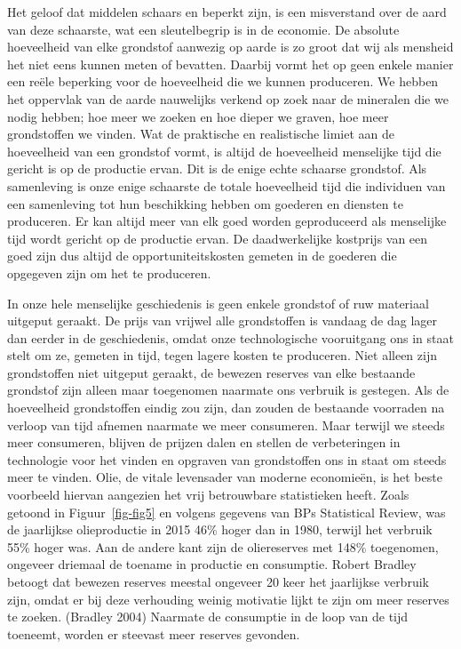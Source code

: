 \documentclass[
  a5paper,
  smalldemyvopaper,11pt,twoside,onecolumn,openright,extrafontsizes,
hidelinks]{memoir}
\begin{document}
Het geloof dat middelen schaars en beperkt zijn, is een misverstand over
de aard van deze schaarste, wat een sleutelbegrip is in de economie. De
absolute hoeveelheid van elke grondstof aanwezig op aarde is zo groot
dat wij als mensheid het niet eens kunnen meten of bevatten. Daarbij
vormt het op geen enkele manier een reële beperking voor de hoeveelheid
die we kunnen produceren. We hebben het oppervlak van de aarde
nauwelijks verkend op zoek naar de mineralen die we nodig hebben; hoe
meer we zoeken en hoe dieper we graven, hoe meer grondstoffen we vinden.
Wat de praktische en realistische limiet aan de hoeveelheid van een
grondstof vormt, is altijd de hoeveelheid menselijke tijd die gericht is
op de productie ervan. Dit is de enige echte schaarse grondstof. Als
samenleving is onze enige schaarste de totale hoeveelheid tijd die
individuen van een samenleving tot hun beschikking hebben om goederen en
diensten te produceren. Er kan altijd meer van elk goed worden
geproduceerd als menselijke tijd wordt gericht op de productie ervan. De
daadwerkelijke kostprijs van een goed zijn dus altijd de
opportuniteitskosten gemeten in de goederen die opgegeven zijn om het te
produceren.

In onze hele menselijke geschiedenis is geen enkele grondstof of ruw
materiaal uitgeput geraakt. De prijs van vrijwel alle grondstoffen is
vandaag de dag lager dan eerder in de geschiedenis, omdat onze
technologische vooruitgang ons in staat stelt om ze, gemeten in tijd,
tegen lagere kosten te produceren. Niet alleen zijn grondstoffen niet
uitgeput geraakt, de bewezen reserves van elke bestaande grondstof zijn
alleen maar toegenomen naarmate ons verbruik is gestegen. Als de
hoeveelheid grondstoffen eindig zou zijn, dan zouden de bestaande
voorraden na verloop van tijd afnemen naarmate we meer consumeren. Maar
terwijl we steeds meer consumeren, blijven de prijzen dalen en stellen
de verbeteringen in technologie voor het vinden en opgraven van
grondstoffen ons in staat om steeds meer te vinden. Olie, de vitale
levensader van moderne economieën, is het beste voorbeeld hiervan
aangezien het vrij betrouwbare statistieken heeft. Zoals getoond in
Figuur~\ref{fig-fig5} en volgens gegevens van BPs Statistical Review,
was de jaarlijkse olieproductie in 2015 46\% hoger dan in 1980, terwijl
het verbruik 55\% hoger was. Aan de andere kant zijn de oliereserves met
148\% toegenomen, ongeveer driemaal de toename in productie en
consumptie. Robert Bradley betoogt dat bewezen reserves meestal ongeveer
20 keer het jaarlijkse verbruik zijn, omdat er bij deze verhouding
weinig motivatie lijkt te zijn om meer reserves te zoeken. (Bradley
2004) Naarmate de consumptie in de loop van de tijd toeneemt, worden er
steevast meer reserves gevonden.
\end{document}
